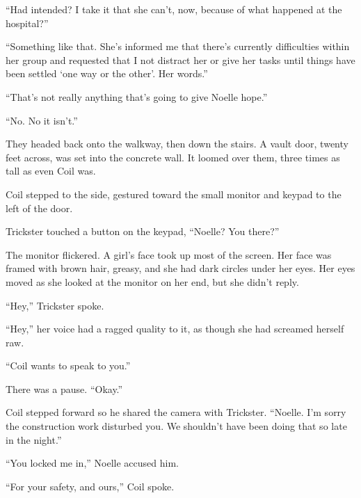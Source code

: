 ``Had intended?  I take it that she can't, now, because of what happened at the hospital?''



``Something like that. She's informed me that there's currently difficulties within her group and requested that I not distract her or give her tasks until things have been settled `one way or the other'.  Her words.''



``That's not really anything that's going to give Noelle hope.''



``No.  No it isn't.''



They headed back onto the walkway, then down the stairs.  A vault door, twenty feet across, was set into the concrete wall.  It loomed over them, three times as tall as even Coil was.



Coil stepped to the side, gestured toward the small monitor and keypad to the left of the door.



Trickster touched a button on the keypad, ``Noelle?  You there?''



The monitor flickered.  A girl's face took up most of the screen.  Her face was framed with brown hair, greasy, and she had dark circles under her eyes.  Her eyes moved as she looked at the monitor on her end, but she didn't reply.



``Hey,'' Trickster spoke.



``Hey,'' her voice had a ragged quality to it, as though she had screamed herself raw.



``Coil wants to speak to you.''



There was a pause.  ``Okay.''



Coil stepped forward so he shared the camera with Trickster.  ``Noelle.  I'm sorry the construction work disturbed you.  We shouldn't have been doing that so late in the night.''



``You locked me in,'' Noelle accused him.



``For your safety, and ours,'' Coil spoke.



